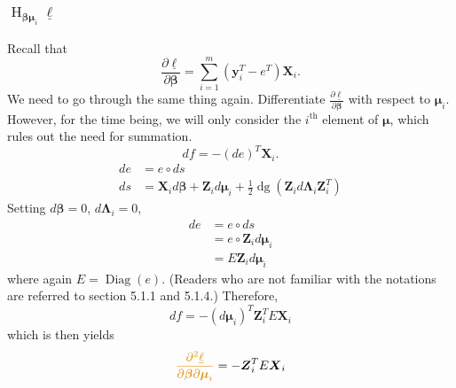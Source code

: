\documentclass[11pt]{article}
\newcommand{\bs}{\boldsymbol}
\newcommand{\opn}{\operatorname}
\begin{document}
\subsubsection{$\opn{H}_{\bs{\beta} \bs{\mu}_{i}}\underline{\ell} $ }
Recall that
$$
\frac{\partial \underline{\ell}}{\partial \bs{\beta}} = \sum_{i=1}^{m} \left( \bs{y}_{i}^{T} - e^{T} \right) \bs{X}_{i}.
$$
We need to go through the same thing again. Differentiate $\frac{\partial \underline{\ell}}{\partial \bs{\beta}}$ with respect to $\bs{\mu}_{i}$. However, for the time being, we will only consider the $i^{\text{th}}$ element of $\bs{\mu}$, which rules out the need for summation.
$$  
  df = - \left(de\right)^{T}\bs{X}_{i}.
$$
\begin{align*}
  de &= e \circ ds\\
  ds &= \bs{X}_{i}d\bs{\beta} + \bs{Z}_{i}d\bs{\mu}_{i} + \frac{1}{2}\opn{dg}\left(\bs{Z}_{i}d\bs{\Lambda}_{i}\bs{Z}_{i}^{T} \right)
\end{align*}
Setting $d\bs{\beta}=0$, $d\bs{\Lambda}_{i} = 0$,
\begin{align*}
  de &= e \circ ds\\
     &= e \circ \bs{Z}_{i}d\bs{\mu}_{i}\\
     &= E\bs{Z}_{i}d\bs{\mu}_{i}
\end{align*}
where again $E = \opn{Diag}\left(e \right)$. (Readers who are not familiar with the notations are referred to section 5.1.1 and 5.1.4.)
Therefore,
$$
  df = -\left(d\bs{\mu}_{i}\right)^{T}\bs{Z}_{i}^{T}E\bs{X}_{i}
$$
which is then yields
$$
  \textcolor{myorange}{\frac{\partial^{2} \underline{\ell}}{\partial \bs{\beta} \partial \bs{\mu}_{i}}} = -\bs{Z}_{i}^{T}E\bs{X}_{i}
$$
\end{document}
